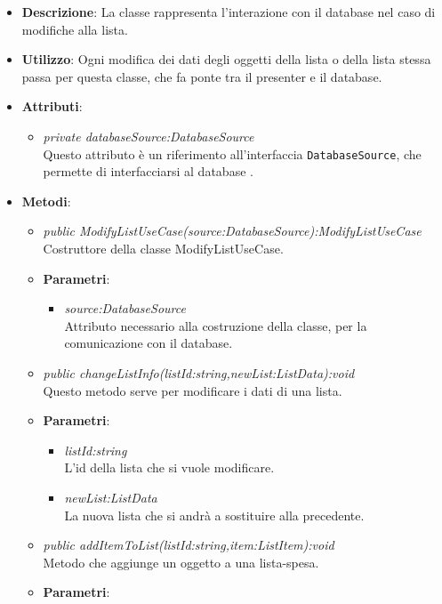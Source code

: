 \begin{itemize}
\item \textbf{Descrizione}: La classe rappresenta l'interazione con il database nel caso di modifiche alla lista.
\item \textbf{Utilizzo}: Ogni modifica dei dati degli oggetti della lista o della lista stessa passa per questa classe, che fa ponte tra il presenter e il database.
\item \textbf{Attributi}: 
	\begin{itemize}
	\item \textit{private databaseSource:DatabaseSource}\\
	Questo attributo è un riferimento all'interfaccia \texttt{DatabaseSource}, che permette di interfacciarsi al database .
	\end{itemize}
\item \textbf{Metodi}:
	\begin{itemize}
	\item \textit{public ModifyListUseCase(source:DatabaseSource):ModifyListUseCase}\\
	Costruttore della classe ModifyListUseCase.
			\item{\textbf{Parametri}: \begin{itemize}
			\item \textit{source:DatabaseSource}\\
			Attributo necessario alla costruzione della classe, per la comunicazione con  il database.
			\end{itemize}}
	\item \textit{public changeListInfo(listId:string,newList:ListData):void}\\
	Questo metodo serve per modificare i dati di una lista.
			\item{\textbf{Parametri}: \begin{itemize}
			\item \textit{listId:string}\\
			L'id della lista che si vuole modificare.
			\item \textit{newList:ListData}\\
			La nuova lista che si andrà a sostituire alla precedente.
			\end{itemize}}
	\item \textit{public addItemToList(listId:string,item:ListItem):void}\\
	Metodo che aggiunge un oggetto a una lista-spesa.
			\item{\textbf{Parametri}: \begin{itemize}

\end{itemize}}
\end{itemize}
\end{itemize}

